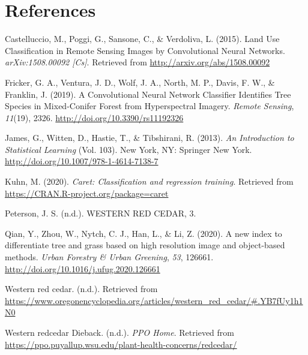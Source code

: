 \documentclass[12pt,twoside]{reedthesis}
\begin{document}
\hypertarget{references}{%
\chapter*{References}\label{references}}


\noindent

\setlength{\parindent}{-0.20in}
\setlength{\leftskip}{0.20in}
\setlength{\parskip}{8pt}

\hypertarget{refs}{}
\leavevmode\hypertarget{ref-castelluccio_land_2015}{}%
Castelluccio, M., Poggi, G., Sansone, C., \& Verdoliva, L. (2015). Land Use Classification in Remote Sensing Images by Convolutional Neural Networks. \emph{arXiv:1508.00092 {[}Cs{]}}. Retrieved from \url{http://arxiv.org/abs/1508.00092}

\leavevmode\hypertarget{ref-fricker_convolutional_2019}{}%
Fricker, G. A., Ventura, J. D., Wolf, J. A., North, M. P., Davis, F. W., \& Franklin, J. (2019). A Convolutional Neural Network Classifier Identifies Tree Species in Mixed-Conifer Forest from Hyperspectral Imagery. \emph{Remote Sensing}, \emph{11}(19), 2326. \url{http://doi.org/10.3390/rs11192326}

\leavevmode\hypertarget{ref-james_introduction_2013}{}%
James, G., Witten, D., Hastie, T., \& Tibshirani, R. (2013). \emph{An Introduction to Statistical Learning} (Vol. 103). New York, NY: Springer New York. \url{http://doi.org/10.1007/978-1-4614-7138-7}

\leavevmode\hypertarget{ref-caret}{}%
Kuhn, M. (2020). \emph{Caret: Classification and regression training}. Retrieved from \url{https://CRAN.R-project.org/package=caret}

\leavevmode\hypertarget{ref-peterson_western_nodate}{}%
Peterson, J. S. (n.d.). WESTERN RED CEDAR, 3.

\leavevmode\hypertarget{ref-qian_new_2020}{}%
Qian, Y., Zhou, W., Nytch, C. J., Han, L., \& Li, Z. (2020). A new index to differentiate tree and grass based on high resolution image and object-based methods. \emph{Urban Forestry \& Urban Greening}, \emph{53}, 126661. \url{http://doi.org/10.1016/j.ufug.2020.126661}

\leavevmode\hypertarget{ref-noauthor_western_nodate-1}{}%
Western red cedar. (n.d.). Retrieved from \url{https://www.oregonencyclopedia.org/articles/western_red_cedar/\#.YB7fUy1h1N0}

\leavevmode\hypertarget{ref-noauthor_western_nodate}{}%
Western redcedar Dieback. (n.d.). \emph{PPO Home}. Retrieved from \url{https://ppo.puyallup.wsu.edu/plant-health-concerns/redcedar/}


\end{document}
